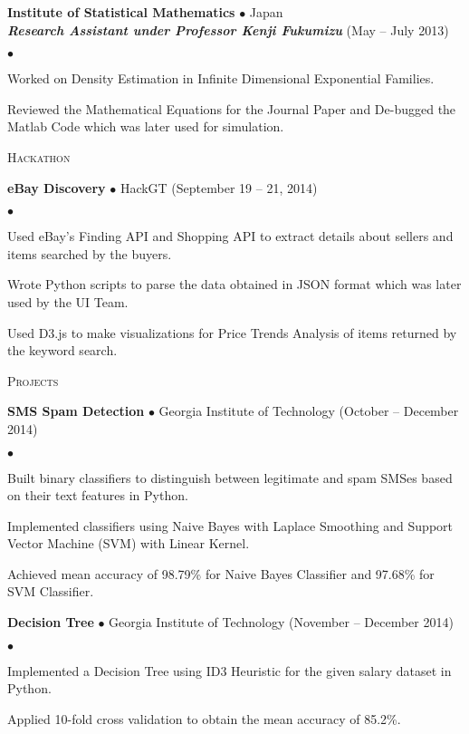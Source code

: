 \documentclass[10pt]{article}
\newcommand{\lineunder}{\\\vspace{-9pt}\hrulefill}
\newcommand{\header}[1]{{\normalsize\scshape{#1}} \lineunder}
\newcommand{\project}[3]{{ \textbf{#1} $\bullet$ #2 \hfill (#3)\\  }}
\newenvironment{achievements}{\begin{list}{$\bullet$}{\topsep 0pt \itemsep 0pt}}{\end{list}}
\newcommand{\employer}[4]{ \textbf{#1} $\bullet$ #2 \\ \textbf{\emph{#4}} \hfill (#3)\\  }
\begin{document}
\employer{Institute of Statistical Mathematics}{Japan}{May -- July 2013}{Research Assistant under Professor Kenji Fukumizu}
	\begin{achievements}
	\item Worked on Density Estimation in Infinite Dimensional Exponential Families.
	\item Reviewed the Mathematical Equations for the Journal Paper and De-bugged the Matlab Code which was later used for simulation.
	\end{achievements}
	
\vspace{3pt}

\header{Hackathon}

\project{eBay Discovery}{HackGT}{September 19 -- 21, 2014}
	\begin{achievements}
	\item Used eBay's Finding API and Shopping API to extract details about sellers and items searched by the buyers.
	\item Wrote Python scripts to parse the data obtained in JSON format which was later used by the UI Team.
	\item Used D3.js to make visualizations for Price Trends Analysis of items returned by the keyword search.
	\end{achievements}	
	
\vspace{3pt}

\header{Projects}

\project{SMS Spam Detection}{Georgia Institute of Technology}{October -- December 2014}
	\begin{achievements}
	\item Built binary classifiers to distinguish between legitimate and spam SMSes based on their text features in Python.
	\item Implemented classifiers using Naive Bayes with Laplace Smoothing and Support Vector Machine (SVM) with Linear Kernel.
	\item Achieved mean accuracy of 98.79\% for Naive Bayes Classifier and 97.68\% for SVM Classifier.
	\end{achievements}	
	
\project{Decision Tree}{Georgia Institute of Technology}{November -- December 2014}
	\begin{achievements}
	\item Implemented a Decision Tree using ID3 Heuristic for the given salary dataset in Python.
	\item Applied 10-fold cross validation to obtain the mean accuracy of 85.2\%.
	\end{achievements}	
	
\end{document}
